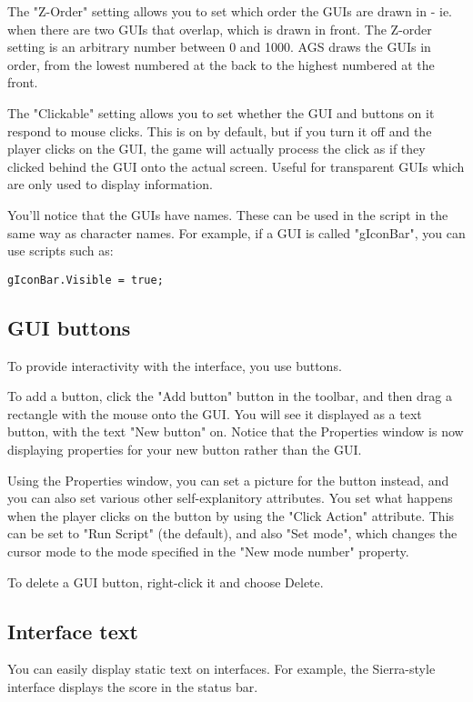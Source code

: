 The "Z-Order" setting allows you to set which order the GUIs are drawn in - ie. when
there are two GUIs that overlap, which is drawn in front. The Z-order setting is an
arbitrary number between 0 and 1000. AGS draws the GUIs in order, from the lowest numbered
at the back to the highest numbered at the front.

The "Clickable" setting allows you to set whether the GUI and buttons on it
respond to mouse clicks. This is on by default, but if you turn it off and
the player clicks on the GUI, the game will actually process the click as if
they clicked behind the GUI onto the actual screen. Useful for transparent GUIs
which are only used to display information.

You'll notice that the GUIs have names. These can be used in the script in the
same way as character names. For example, if a GUI is called "gIconBar", you can use
scripts such as:

\verb$gIconBar.Visible = true;$


\subsection{GUI buttons}%

To provide interactivity with the interface, you use buttons.

To add a button, click the "Add button" button in the toolbar, and then drag a rectangle
with the mouse onto the GUI. You will see it displayed as a text button, with
the text "New button" on. Notice that the Properties window is now displaying
properties for your new button rather than the GUI.

Using the Properties window, you can set a picture for the button instead,
and you can also set various other self-explanitory attributes.
You set what happens when the player clicks on the button by using the "Click
Action" attribute. This can be set to "Run Script" (the default), and also "Set
mode", which changes the cursor mode to the mode specified in the "New mode number"
property.

To delete a GUI button, right-click it and choose Delete.

\subsection{Interface text}%

You can easily display static text on interfaces. For example, the Sierra-style
interface displays the score in the status bar.

